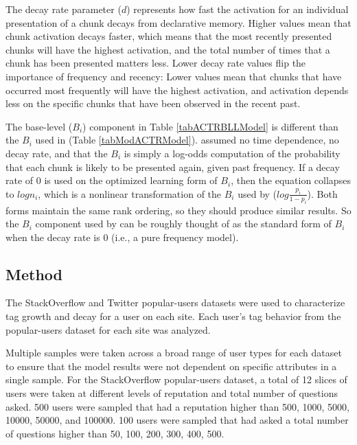 \documentclass[man,floatsintext,donotrepeattitle]{apa6}
\begin{document}
The decay rate parameter ($d$) represents how fast the activation for an individual presentation of a chunk decays from declarative memory.
Higher values mean that chunk activation decays faster, which means that the most recently presented chunks will have the highest activation, and the total number of times that a chunk has been presented matters less.
Lower decay rate values flip the importance of frequency and recency: Lower values mean that chunks that have occurred most frequently will have the highest activation,
and activation depends less on the specific chunks that have been observed in the recent past.

The base-level ($B_{i}$) component in Table \ref{tabACTRBLLModel} is different than the $B_{i}$ used in \textcite{Stanley2013} (Table \ref{tabModACTRModel}).
\citeauthor{Stanley2013} assumed no time dependence, no decay rate, and that the $B_{i}$ is simply a log-odds computation of the probability that each chunk is likely to be presented again, given past frequency.
If a decay rate of 0 is used on the optimized learning form of $B_{i}$, then the equation collapses to $log n_{i}$,
which is a nonlinear transformation of the $B_{i}$ used by \citeauthor{Stanley2013} ($log \frac{p_{i}}{1-p_{i}}$).
Both forms maintain the same rank ordering, so they should produce similar results.
So the $B_{i}$ component used by \citeauthor{Stanley2013} can be roughly thought of as the standard form of $B_{i}$ when the decay rate is 0 (i.e., a pure frequency model).

\subsection{Method}

The StackOverflow and Twitter popular-users datasets were used to characterize tag growth and decay for a user on each site.
Each user's tag behavior from the popular-users dataset for each site was analyzed. 

Multiple samples were taken across a broad range of user types for each dataset to ensure that the model results were not dependent on specific attributes in a single sample.
For the StackOverflow popular-users dataset, a total of 12 slices of users were taken at different levels of reputation and total number of questions asked.
500 users were sampled that had a reputation higher than \num{500}, \num{1000}, \num{5000}, \num{10000}, \num{50000}, and \num{100000}.
100 users were sampled that had asked a total number of questions higher than \num{50}, \num{100}, \num{200}, \num{300}, \num{400}, \num{500}.
\end{document}
